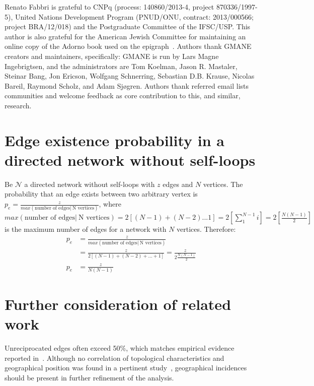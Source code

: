 \documentclass[%
 aip,
 jmp,%
 amsmath,amssymb,
 reprint,%
]{revtex4-1}
\begin{document}
\begin{acknowledgments}
Renato Fabbri is grateful to CNPq (process: 140860/2013-4,
project 870336/1997-5), United Nations Development Program (PNUD/ONU, contract: 2013/000566; project BRA/12/018)  and 
the Postgraduate Committee of the IFSC/USP. This author is also grateful for
the American Jewish Committee for maintaining an online copy of the Adorno book
used on the epigraph~\cite{adorno}. Authors thank GMANE creators and maintainers, specifically: GMANE is run by Lars Magne Ingebrigtsen, and the administrators are Tom Koelman, Jason R. Mastaler, Steinar Bang, Jon Ericson, Wolfgang Schnerring, Sebastian D.B. Krause, Nicolas Bareil, Raymond Scholz, and Adam Sjøgren. Authors thank referred email lists communities and welcome feedback as core contribution to this, and similar, research.
\end{acknowledgments}


\appendix
\section{Edge existence probability in a directed network without self-loops}\label{ap:ded}
Be $\mathcal{N}$ a directed network without self-loops with $z$ edges and $N$ vertices. The probability that an edge exists between two arbitrary vertex is $p_e=\frac{z}{max( \text{number of edges} |\ \text{N vertices})}$, where $max( \text{number of edges} |\ \text{N vertices})=2[(N-1)+(N-2)...1]=2[\sum_1^{N-1}i]=2[\frac{N(N-1)}{2}]$ is the maximum number of edges for a network with $N$ vertices. Therefore:
\begin{align}
    p_e&=\frac{z}{max( \text{number of edges} |\ \text{N vertices})} \\       &=\frac{z}{2[(N-1)+(N-2)+...+1]}=\frac{z}{2\frac{N(N-1)}{2}} \\
   p_e &=\frac{z}{N(N-1)}
\end{align}

\section{Further consideration of related work}\label{sec:fure}
Unreciprocated edges often exceed 50\%, which matches empirical evidence reported in~\cite{newmanEvolving}. Although no correlation of topological characteristics and geographical position was found in a pertinent study~\cite{barabasiGeo}, geographical incidences should be present in further refinement of the analysis.
\end{document}
